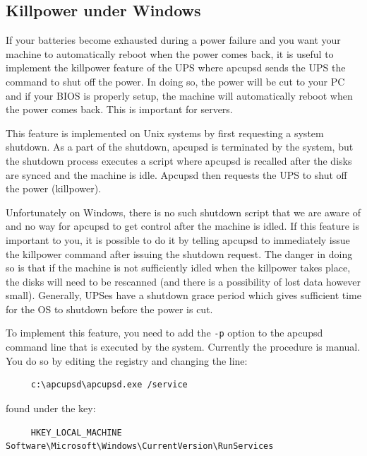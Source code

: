 {{{{{{{\label{Killpower-under-Windows}

\subsection*{Killpower under Windows}

\label{index-Windows_002c-Killpower-183}
If your batteries become exhausted during a power failure and you want your
machine to automatically reboot when the power comes back, it is useful to
implement the killpower feature of the UPS where apcupsd sends the UPS the
command to shut off the power.  In doing so, the power will be cut to your PC
and if your BIOS is properly setup, the machine will automatically reboot when
the power comes back. This is important for servers.  

This feature is implemented on Unix systems by first requesting a system
shutdown. As a part of the shutdown, apcupsd is terminated by the system, but
the shutdown process executes a script where apcupsd is recalled after the
disks are synced and the machine is idle. Apcupsd then requests the UPS to
shut off the power (killpower).  

Unfortunately on Windows, there is no such shutdown script that we are aware
of and no way for apcupsd to get control after the machine is idled. If this
feature is important to you, it is possible to do it by telling apcupsd to
immediately issue the killpower command after issuing the shutdown request.
The danger in doing so is that if the machine is not sufficiently idled when
the killpower takes place, the disks will need to be rescanned (and there is a
possibility of lost data however small). Generally, UPSes have a shutdown
grace period which gives sufficient time for the OS to shutdown before the
power is cut.  

To implement this feature, you need to add the {\tt -p} option to the apcupsd
command line that is executed by the system.  Currently the procedure is
manual. You do so by editing the registry and changing the line: 

\footnotesize
\begin{verbatim}
     c:\apcupsd\apcupsd.exe /service
\end{verbatim}
\normalsize

found under the key: 

\footnotesize
\begin{verbatim}
     HKEY_LOCAL_MACHINE Software\Microsoft\Windows\CurrentVersion\RunServices
\end{verbatim}
\normalsize

}}}}}}}
